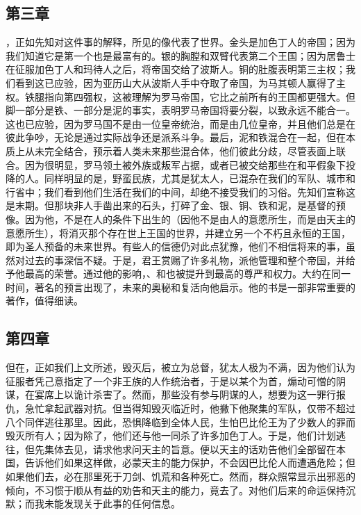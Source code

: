 
\subsection{第三章}

，正如先知对这件事的解释，所见的像代表了世界。金头是加色丁人的帝国；因为我们知道它是第一个也是最富有的。银的胸膛和双臂代表第二个王国；因为居鲁士在征服加色丁人和玛待人之后，将帝国交给了波斯人。铜的肚腹表明第三主权；我们看到这已应验，因为亚历山大从波斯人手中夺取了帝国，为马其顿人赢得了主权。铁腿指向第四强权，这被理解为罗马帝国，它比之前所有的王国都更强大。但脚一部分是铁、一部分是泥的事实，表明罗马帝国将要分裂，以致永远不能合一。这也已应验，因为罗马国不是由一位皇帝统治，而是由几位皇帝，并且他们总是在彼此争吵，无论是通过实际战争还是派系斗争。最后，泥和铁混合在一起，但在本质上从未完全结合，预示着人类未来那些混合体，他们彼此分歧，尽管表面上联合。因为很明显，罗马领土被外族或叛军占据，或者已被交给那些在和平假象下投降的人。同样明显的是，野蛮民族，尤其是犹太人，已混杂在我们的军队、城市和行省中；我们看到他们生活在我们的中间，却绝不接受我们的习俗。先知们宣称这是末期。但那块非人手凿出来的石头，打碎了金、银、铜、铁和泥，是基督的预像。因为他，不是在人的条件下出生的（因他不是由人的意愿所生，而是由天主的意愿所生），将消灭那个存在世上王国的世界，并建立另一个不朽且永恒的王国，即为圣人预备的未来世界。有些人的信德仍对此点犹豫，他们不相信将来的事，虽然对过去的事深信不疑。于是，君王赏赐了许多礼物，派他管理和整个帝国，并给予他最高的荣誉。通过他的影响，、和也被提升到最高的尊严和权力。大约在同一时间，著名的预言出现了，未来的奥秘和复活向他启示。他的书是一部非常重要的著作，值得细读。\par


\subsection{第四章}

但在，正如我们上文所述，毁灭后，被立为总督，犹太人极为不满，因为他们认为征服者凭己意指定了一个非王族的人作统治者，于是以某个为首，煽动可憎的阴谋，在宴席上以诡计杀害了。然而，那些没有参与阴谋的人，想要为这一罪行报仇，急忙拿起武器对抗。但当得知毁灭临近时，他撇下他聚集的军队，仅带不超过八个同伴逃往那里。因此，恐惧降临到全体人民，生怕巴比伦王为了少数人的罪而毁灭所有人；因为除了，他们还与他一同杀了许多加色丁人。于是，他们计划逃往，但先集体去见，请求他求问天主的旨意。便以天主的话劝告他们全部留在本国，告诉他们如果这样做，必蒙天主的能力保护，不会因巴比伦人而遭遇危险；但如果他们去，必在那里死于刀剑、饥荒和各种死亡。然而，群众照常显示出邪恶的倾向，不习惯于顺从有益的劝告和天主的能力，竟去了。对他们后来的命运保持沉默；而我未能发现关于此事的任何信息。\par

